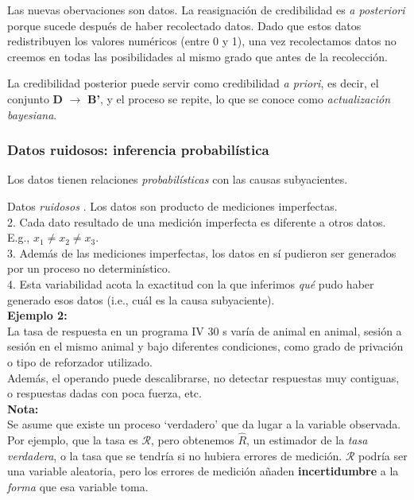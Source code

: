\documentclass{scrartcl}
\begin{document}
		Las nuevas obervaciones son datos. La reasignación de credibilidad es \textit{a posteriori} porque sucede después de haber recolectado datos. Dado que estos datos redistribuyen los valores numéricos (entre 0 y 1), una vez recolectamos datos no creemos en todas las posibilidades al mismo grado que antes de la recolección.
		
		La credibilidad posterior puede servir como credibilidad \textit{a priori}, es decir, el conjunto \textbf{D} $\rightarrow$ \textbf{B'}, y el proceso se repite, lo que se conoce como \textit{actualización bayesiana}. 
		
		\subsubsection{Datos ruidosos: inferencia probabilística}
		
		Los datos tienen relaciones \textit{probabilísticas} con las causas subyacientes. 
		
		\begin{tcolorbox}
			Datos \textit{ruidosos}
			. Los datos son producto de mediciones imperfectas. \\
			2. Cada dato resultado de una medición imperfecta es diferente a otros datos. E.g., $x_1 \neq x_2 \neq x_3$.\\
			3. Además de las mediciones imperfectas, los datos en sí pudieron ser generados por un proceso no determinístico. \\
			4. Esta variabilidad acota la exactitud con la que inferimos \textit{qué} pudo haber generado esos datos (i.e., cuál es la causa subyaciente).\\
			\textsf{\textbf{Ejemplo 2:}}\\
			La tasa de respuesta en un programa IV 30 s varía de animal en animal, sesión a sesión en el mismo animal y bajo diferentes condiciones, como grado de privación o tipo de reforzador utilizado. \\
			Además, el operando puede descalibrarse, no detectar respuestas muy contiguas, o respuestas dadas con poca fuerza, etc. \\
			\textsf{\textbf{Nota:}}\\
			\HandRight \hspace*{0.1em} Se asume que existe un proceso `verdadero' que da lugar a la variable observada. Por ejemplo, que la tasa es $\mathcal{R}$, pero obtenemos $\hat R$, un estimador de la \textit{tasa verdadera}, o la tasa que se tendría si no hubiera errores de medición. $\mathcal{R}$ podría ser una variable aleatoria, pero los errores de medición añaden \textbf{incertidumbre} a la \textit{forma} que esa variable toma. 
		\end{tcolorbox}
	
\end{document}
